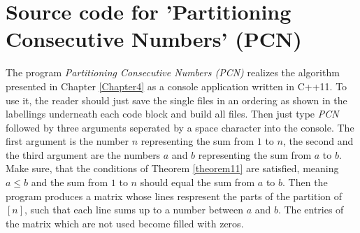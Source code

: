 \chapter{Source code for 'Partitioning Consecutive Numbers' (PCN)}

\label{AppendixB}

The program \textit{Partitioning Consecutive Numbers (PCN)} realizes the algorithm presented in Chapter \ref{Chapter4} as a console application written in C++11. To use it, the reader should just save the single files in an ordering as shown in the labellings underneath each code block and build all files. Then just type \textit{PCN} followed by three arguments seperated by a space character into the console. The first argument is the number \(n\) representing the sum from \(1\) to \(n\), the second and the third argument are the numbers \(a\) and \(b\) representing the sum from \(a\) to \(b\). Make sure, that the conditions of Theorem \ref{theorem11} are satisfied, meaning \(a\leq b\) and the sum from \(1\) to \(n\) should equal the sum from \(a\) to \(b\). Then the program produces a matrix whose lines respresent the parts of the partition of \([n]\), such that each line sums up to a number between \(a\) and \(b\). The entries of the matrix which are not used become filled with zeros.\\
\\














